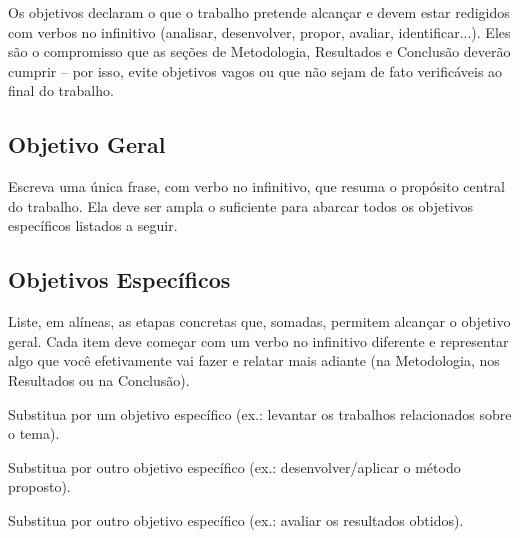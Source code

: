 Os objetivos declaram o que o trabalho pretende alcançar e devem estar redigidos com verbos no infinitivo (analisar, desenvolver, propor, avaliar, identificar...). Eles são o compromisso que as seções de Metodologia, Resultados e Conclusão deverão cumprir -- por isso, evite objetivos vagos ou que não sejam de fato verificáveis ao final do trabalho.

\subsection{Objetivo Geral}
\label{sec:objetivo-geral}

Escreva uma única frase, com verbo no infinitivo, que resuma o propósito central do trabalho. Ela deve ser ampla o suficiente para abarcar todos os objetivos específicos listados a seguir.

\subsection{Objetivos Específicos}
\label{sec:objetivos-especificos}

Liste, em alíneas, as etapas concretas que, somadas, permitem alcançar o objetivo geral. Cada item deve começar com um verbo no infinitivo diferente e representar algo que você efetivamente vai fazer e relatar mais adiante (na Metodologia, nos Resultados ou na Conclusão).

	\begin{alineas}
		\item Substitua por um objetivo específico (ex.: levantar os trabalhos relacionados sobre o tema).
		\item Substitua por outro objetivo específico (ex.: desenvolver/aplicar o método proposto).
		\item Substitua por outro objetivo específico (ex.: avaliar os resultados obtidos).
	\end{alineas}
